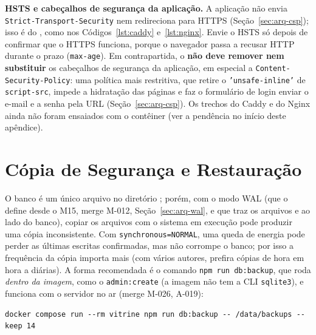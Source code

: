 \textbf{HSTS e cabeçalhos de segurança da aplicação.} A aplicação não envia \texttt{Strict-Transport-Security} nem redireciona para HTTPS (Seção~\ref{sec:arq-csp}); isso é do , como nos Códigos~\ref{lst:caddy} e~\ref{lst:nginx}. Envie o HSTS só depois de confirmar que o HTTPS funciona, porque o navegador passa a recusar HTTP durante o prazo (\texttt{max-age}). Em contrapartida, o  \textbf{não deve remover nem substituir} os cabeçalhos de segurança da aplicação, em especial a \texttt{Content-Security-Policy}: uma política mais restritiva, que retire o \texttt{'unsafe-inline'} de \texttt{script-src}, impede a hidratação das páginas e faz o formulário de login enviar o e-mail e a senha pela URL (Seção~\ref{sec:arq-csp}). Os trechos do Caddy e do Nginx ainda não foram ensaiados com o contêiner (ver a pendência no início deste apêndice).

\section{Cópia de Segurança e Restauração}\label{sec:backup}

O banco é um único arquivo no diretório ; porém, com o modo WAL (que o  define desde o M15, merge M-012, Seção~\ref{sec:arq-wal}, e que traz os arquivos  e  ao lado do banco), copiar os arquivos com o sistema em execução pode produzir uma cópia inconsistente. Com \texttt{synchronous=NORMAL}, uma queda de energia pode perder as últimas escritas confirmadas, mas não corrompe o banco; por isso a frequência da cópia importa mais (com vários autores, prefira cópias de hora em hora a diárias). A forma recomendada é o comando \texttt{npm run db:backup}, que roda \emph{dentro da imagem}, como o \texttt{admin:create} (a imagem não tem a CLI \texttt{sqlite3}), e funciona com o servidor no ar (merge M-026, A-019):

\begin{lstlisting}[language=VSh, caption={Cópia de segurança consistente e verificada do SQLite}, label={lst:backup}]
docker compose run --rm vitrine npm run db:backup -- /data/backups --keep 14
\end{lstlisting}

